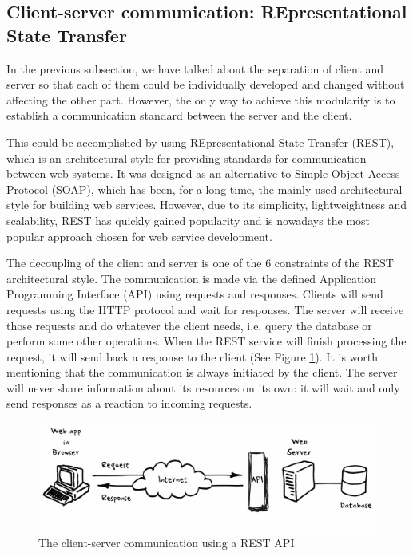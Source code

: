 \subsection{Client-server communication: REpresentational State Transfer}
\label{subsection:rest}

In the previous subsection, we have talked about the separation of client and server so that each of them could be individually developed and changed without affecting the other part. However, the only way to achieve this modularity is to establish a communication standard between the server and the client.

This could be accomplished by using REpresentational State Transfer (REST), which is an architectural style for providing standards for communication between web systems. It was designed as an alternative to Simple Object Access Protocol (SOAP), which has been, for a long time, the mainly used architectural style for building web services. However, due to its simplicity, lightweightness and scalability, REST has quickly gained popularity and is nowadays the most popular approach chosen for web service development.

The decoupling of the client and server is one of the 6 constraints of the REST architectural style. The communication is made via the defined Application Programming Interface (API) using requests and responses. Clients will send requests using the HTTP protocol and wait for responses. The server will receive those requests and do whatever the client needs, i.e. query the database or perform some other operations. When the REST service will finish processing the request, it will send back a response to the client (See Figure \ref{rest}). It is worth mentioning that the communication is always initiated by the client. The server will never share information about its resources on its own: it will wait and only send responses as a reaction to incoming requests.

\begin{figure}[H]
    \centering
    \includegraphics[width=5in]{images/rest}
    \caption{The client-server communication using a REST API \cite{rest}}
    \label{rest}
\end{figure}

